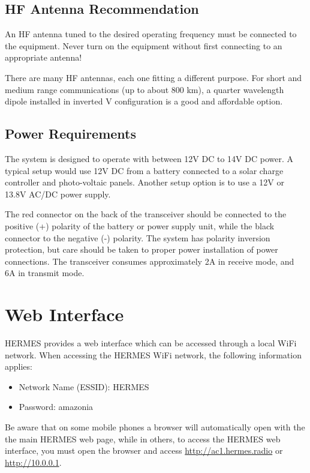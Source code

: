 \documentclass[11pt,a4paper]{article}
\begin{document}
\subsection{HF Antenna Recommendation}

An HF antenna tuned to the desired operating frequency must be connected to the equipment. Never turn on the equipment without first connecting to an appropriate antenna!

There are many HF antennas, each one fitting a different purpose. For short and medium range communications (up to about 800 km), a quarter wavelength dipole installed in inverted V configuration is a good and affordable option. %

\subsection{Power Requirements}

The system is designed to operate with between 12V DC to 14V DC power. A typical setup would use 12V DC from a battery connected to a solar charge controller and photo-voltaic panels. Another setup option is to use a 12V or 13.8V AC/DC power supply. 

The red connector on the back of the transceiver should be connected to the positive (+) polarity of the battery or power supply unit, while the black connector to the negative (-) polarity. The system has polarity inversion protection, but care should be taken to proper power installation of power connections. The transceiver consumes approximately 2A in receive mode, and 6A in transmit mode. %

\section{Web Interface}

HERMES provides a web interface which can be accessed through a local WiFi network. When accessing the HERMES WiFi network, the following information applies:
\begin{itemize}
    \item Network Name (ESSID): HERMES
    \item Password: amazonia
\end{itemize}

Be aware that on some mobile phones a browser will automatically open with the the main HERMES web page, while in others, to access the HERMES web interface, you must open the browser and access \url{http://ac1.hermes.radio} or \url{http://10.0.0.1}.
\end{document}
